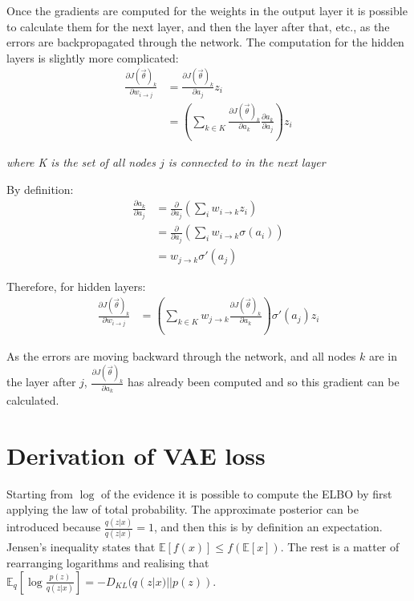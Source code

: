 Once the gradients are computed for the weights in the output layer it is possible to calculate them for the next layer, and then the
layer after that, etc., as the errors are backpropagated through the network. The computation for the hidden layers is slightly more 
complicated:
\begin{align}
  \frac{\partial J(\vec{\theta})_k}{\partial w_{i \to j}} & = \frac{\partial J(\vec{\theta})_k}{\partial a_j} z_i \\
  & = \left( \sum_{k \in K} \frac{\partial J(\vec{\theta})_k}{\partial a_k} \frac{\partial a_k}{\partial a_j} \right) z_i
\end{align}
\begin{center}
  \textit{where K is the set of all nodes $j$ is connected to in the next layer}
\end{center}

By definition:
\begin{align}
  \frac{\partial a_k}{\partial a_j} & = \frac{\partial}{\partial a_j} \left( \sum_{i} w_{i \to k} z_i \right) \\
  & = \frac{\partial}{\partial a_j} \left( \sum_{i} w_{i \to k} \sigma(a_i) \right) \\
  & = w_{j \to k} \sigma'(a_j)
\end{align}

Therefore, for hidden layers:
\begin{align}
  \frac{\partial J(\vec{\theta})_k}{\partial w_{i \to j}} & = \left( \sum_{k \in K} w_{j \to k} \frac{\partial J(\vec{\theta})_k}{\partial a_k} \right) \sigma'(a_j) z_i
\end{align}

As the errors are moving backward through the network, and all nodes $k$ are in the layer after $j$, $\frac{\partial J(\vec{\theta})_k}{\partial a_k}$
has already been computed and so this gradient can be calculated.

\chapter{Derivation of VAE loss} \label{vae_loss}

Starting from $\log$ of the evidence it is possible to compute the ELBO by first applying the law of total probability. The approximate posterior can be introduced because $\frac{q(z|x)}{q(z|x)} = 1$, and then this is by definition an expectation. Jensen's inequality states that $\mathbb{E}[f(x)] \leq f(\mathbb{E}[x])$. The rest is a matter of rearranging logarithms and realising that $\mathbb{E}_q\left[\log\frac{p(z)}{q(z|x)}\right] = - D_{KL}(q(z|x)||p(z))$.

